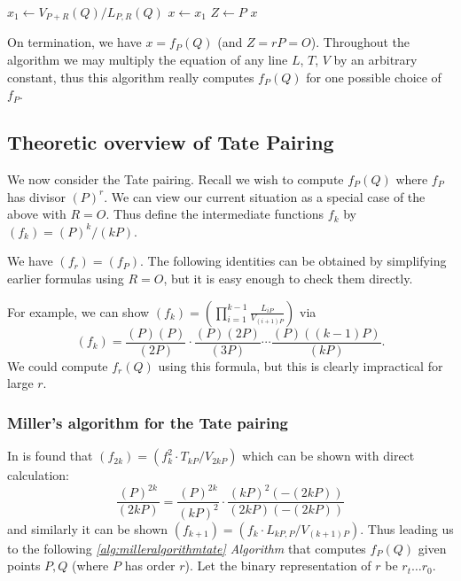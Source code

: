 \begin{algorithm}
	\label{alg:milleralgweiltheory}
	\caption{Miller's algorithm for Weil pairing \cite{lynnpairing2007}. $x = f_P(Q)$}
	$x_1 \leftarrow V_{P+R}(Q) / L_{P,R}(Q)$\;
	$x \leftarrow x_1$\;
	$Z \leftarrow P$\;
	\Return $x$\;
\end{algorithm}

On termination, we have $x = f_P(Q)$ (and $Z = rP = O$). Throughout the algorithm we may multiply the equation of any line $L$, $T$, $V$ by an arbitrary constant, thus this algorithm really computes $f_P(Q)$ for one possible choice of $f_P$.

\subsection{Theoretic overview of Tate Pairing}
\label{secs:ch2.theoretictate}

We now consider the Tate pairing. Recall we wish to compute $f_P(Q)$ where $f_P$ has divisor $(P)^r$. We can view our current situation as a special case of the above with $R = O$. Thus define the intermediate functions $f_k$ by $(f_k) = (P)^k/(kP)$.

We have $(f_r) = (f_P)$. The following identities can be obtained by simplifying earlier formulas using $R = O$, but it is easy enough to check them directly.

For example, we can show $(f_k) = \left( \displaystyle\prod_{i=1}^{k-1} \frac{L_{iP}}{V_{(i+1)P}}\right)$ via
$$(f_k) = \frac{(P)(P)}{(2P)} \cdot \frac{(P)(2P)}{(3P)} \cdots \frac{(P)((k-1)P)}{(kP)}.$$
We could compute $f_r(Q)$ using this formula, but this is clearly impractical for large $r$.

\subsubsection{Miller's algorithm for the Tate pairing}
\label{sssec:ch3.millersalgorithmfortatepairing}

In \cite{lynnpairing2007} is found that 
$(f_{2k}) = \left(f_k^2 \cdot T_{kP} / V_{2kP}\right)$
which can be shown with direct calculation:
$$\frac{(P)^{2k}}{(2kP)} = \frac{(P)^{2k}}{(kP)^2} \cdot \frac{(kP)^2(-(2kP))}{(2kP)(-(2kP))}$$
and similarly it can be shown
$(f_{k+1}) = (f_k \cdot L_{kP,P} / V_{(k+1)P}).$
Thus leading us to the following \textit{\ref{alg:milleralgorithmtate} Algorithm} that computes $f_P(Q)$ given points $P, Q$ (where $P$ has order $r$). Let the binary representation of $r$ be $r_t \ldots r_0$.


